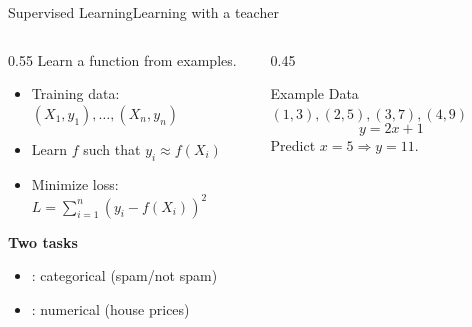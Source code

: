 \documentclass[aspectratio=169,11pt]{beamer}
\begin{document}
\begin{frame}{Supervised Learning}{Learning with a teacher}
  \begin{columns}[T]
    \begin{column}{0.55\textwidth}
      Learn a function from  examples.
      \begin{itemize}\small
        \item Training data: $(X_1,y_1),\ldots,(X_n,y_n)$
        \item Learn $f$ such that $y_i \approx f(X_i)$
        \item Minimize loss: $\displaystyle L = \sum_{i=1}^{n}(y_i - f(X_i))^2$
      \end{itemize}
      \vspace{0.3em}
      \textbf{Two tasks}
      \begin{itemize}\small
        \item {}: categorical (spam/not spam)
        \item {}: numerical (house prices)
      \end{itemize}
    \end{column}
    \begin{column}{0.45\textwidth}
      \begin{block}{Example}
        \small Data $(1,3),(2,5),(3,7),(4,9)$
        \[ y = 2x + 1 \]
        Predict $x=5 \Rightarrow y = 11$.
      \end{block}
      \begin{center}
      \end{center}
    \end{column}
  \end{columns}
\end{frame}
\end{document}
